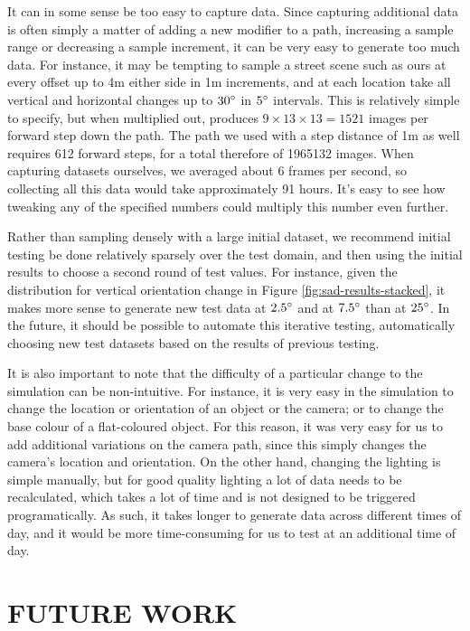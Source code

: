 \documentclass[letterpaper, 10 pt, conference]{ieeeconf}  %
\begin{document}
It can in some sense be too easy to capture data. Since capturing additional data is often simply a matter of adding a new modifier to a path, increasing a sample range or decreasing a sample increment, it can be very easy to generate too much data. For instance, it may be tempting to sample a street scene such as ours at every offset up to 4m either side in 1m increments, and at each location take all vertical and horizontal changes up to $30\degree$ in $5\degree$ intervals. This is relatively simple to specify, but when multiplied out, produces $9 \times 13 \times 13 = 1521$ images per forward step down the path. The path we used with a step distance of 1m as well requires 612 forward steps, for a total therefore of 1965132 images. When capturing datasets ourselves, we averaged about 6 frames per second, so collecting all this data would take approximately 91 hours. It's easy to see how tweaking any of the specified numbers could multiply this number even further.

Rather than sampling densely with a large initial dataset, we recommend initial testing be done relatively sparsely over the test domain, and then using the initial results to choose a second round of test values. For instance, given the distribution for vertical orientation change in Figure \ref{fig:sad-results-stacked}, it makes more sense to generate new test data at $2.5\degree$ and at $7.5\degree$ than at $25\degree$. In the future, it should be possible to automate this iterative testing, automatically choosing new test datasets based on the results of previous testing.

It is also important to note that the difficulty of a particular change to the simulation can be non-intuitive. For instance, it is very easy in the simulation to change the location or orientation of an object or the camera; or to change the base colour of a flat-coloured object. For this reason, it was very easy for us to add additional variations on the camera path, since this simply changes the camera's location and orientation. On the other hand, changing the lighting is simple manually, but for good quality lighting a lot of data needs to be recalculated, which takes a lot of time and is not designed to be triggered programatically. As such, it takes longer to generate data across different times of day, and it would be more time-consuming for us to test at an additional time of day.

\section{FUTURE WORK}
\end{document}
